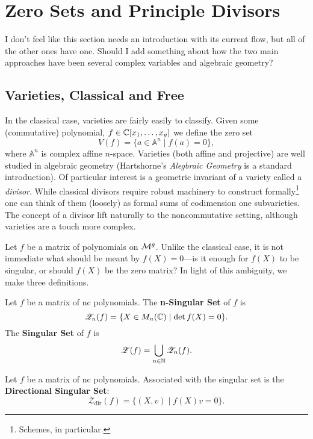 \chapter{Zero Sets and Principle Divisors}\label{ch:ZeroDiv}

{\color{blue} I don't feel like this section needs an introduction with its
  current flow, but all of the other ones have one. Should I add something about
how the two main approaches have been several complex variables and algebraic geometry?}

\section{Varieties, Classical and Free}%
\label{sec:varieties}

In the classical case, varieties are fairly easily to classify. Given some
(commutative) polynomial, \(f \in \mathbb{C} [x_1, \dots, x_g]\) we define the zero set
\[
  V(f) = \{a \in \mathbb{A}^n \mid  f(a) =0\},
\]
where \(\mathbb{A}^n\) is complex affine \(n\)-space.  Varieties (both affine and
projective) are well studied in algebraic geometry
(Hartshorne's \emph{Alegbraic Geometry} \cite{hartshorneAlgebraic2008} is a
standard introduction). Of particular interest is a geometric invariant of a
variety called a \emph{divisor}. While classical divisors require robust machinery to
construct formally\footnote{Schemes, in particular.} one can think of them
(loosely) as formal sums of codimension one subvarieties. The concept of a
divisor lift naturally to the noncommutative setting, although varieties are
a touch more complex.

Let \(f\) be a matrix of polynomials on \(\mathcal{M}^{g} \).
Unlike the classical case, it is not immediate what should be meant by
\(f(X)=0\)---is it enough for \(f(X)\) to be singular, or should \(f(X)\) be the
zero matrix? In light of this ambiguity, we make three definitions.
\begin{definition}%
\label{def:singularset}
  Let \(f\) be a matrix of nc polynomials. The \textbf{n-Singular Set} of \(f\) is
  \[
    \mathscr{Z}_n(f) = \{X \in M_n (\mathbb{C}) \mid \det f(X) =0\}.
  \]
  The \textbf{Singular Set} of \(f\) is
  \[
    \mathscr{Z}(f) = \bigcup_{n \in \mathbb{N} } \mathscr{Z}_n(f).
  \]
\end{definition}

\begin{definition}%
  Let \(f\) be a matrix of nc polynomials. Associated with the singular set is
  the \textbf{Directional Singular Set}:
  \[
    \mathscr{Z}_{\textrm{dir}}(f) = \{(X,v) \mid f(X)v = 0\}.
  \]
\end{definition}

